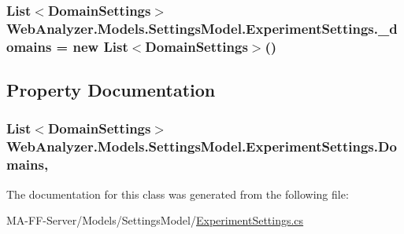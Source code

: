 \subsubsection[{\+\_\+domains}]{\setlength{\rightskip}{0pt plus 5cm}List$<${\bf Domain\+Settings}$>$ Web\+Analyzer.\+Models.\+Settings\+Model.\+Experiment\+Settings.\+\_\+domains = new List$<${\bf Domain\+Settings}$>$()\hspace{0.3cm}{\ttfamily [private]}}\label{class_web_analyzer_1_1_models_1_1_settings_model_1_1_experiment_settings_af281048ad1d067569180dcae2d763522}


\subsection{Property Documentation}
\hypertarget{class_web_analyzer_1_1_models_1_1_settings_model_1_1_experiment_settings_a3eb9dd2816871834368fe4dfd5a1b52e}{}
\subsubsection[{Domains}]{\setlength{\rightskip}{0pt plus 5cm}List$<${\bf Domain\+Settings}$>$ Web\+Analyzer.\+Models.\+Settings\+Model.\+Experiment\+Settings.\+Domains\hspace{0.3cm}{\ttfamily [get]}, {\ttfamily [set]}}\label{class_web_analyzer_1_1_models_1_1_settings_model_1_1_experiment_settings_a3eb9dd2816871834368fe4dfd5a1b52e}


The documentation for this class was generated from the following file\+:\begin{DoxyCompactItemize}
\item 
M\+A-\/\+F\+F-\/\+Server/\+Models/\+Settings\+Model/\hyperlink{_experiment_settings_8cs}{Experiment\+Settings.\+cs}\end{DoxyCompactItemize}
